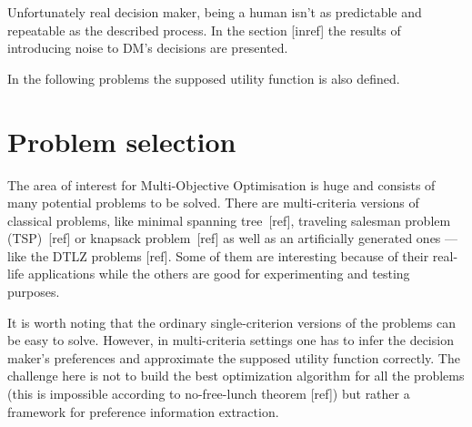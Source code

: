 Unfortunately real decision maker, being a human isn't as predictable and
repeatable as the described process. In the section [inref] the results of
introducing noise to DM's decisions are presented.

In the following problems the supposed utility function is also defined.

\section{Problem selection}

The area of interest for Multi-Objective Optimisation is huge and consists of
many potential problems to be solved. There are multi-criteria versions of
classical problems, like minimal spanning tree~[ref], traveling salesman
problem (TSP)~[ref] or knapsack problem~[ref] as well as an artificially
generated ones --- like the DTLZ problems [ref]. Some of them are interesting
because of their real-life applications while the others are good for
experimenting and testing purposes.

It is worth noting that the ordinary single-criterion versions of the problems
can be easy to solve. However, in multi-criteria settings one has to infer the
decision maker's preferences and approximate the supposed utility function
correctly. The challenge here is not to build the best optimization algorithm
for all the problems (this is impossible according to no-free-lunch theorem
[ref]) but rather a framework for preference information extraction.


